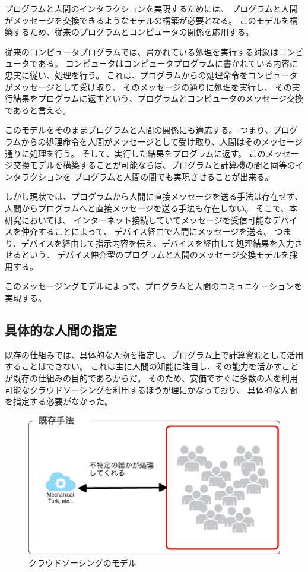 プログラムと人間のインタラクションを実現するためには、
プログラムと人間がメッセージを交換できるようなモデルの構築が必要となる。
このモデルを構築するため、従来のプログラムとコンピュータの関係を応用する。

従来のコンピュータプログラムでは、書かれている処理を実行する対象はコンピュータである。
コンピュータはコンピュータプログラムに書かれている内容に忠実に従い、処理を行う。
これは、プログラムからの処理命令をコンピュータがメッセージとして受け取り、
そのメッセージの通りに処理を実行し、
その実行結果をプログラムに返すという、プログラムとコンピュータのメッセージ交換であると言える。

このモデルをそのままプログラムと人間の関係にも適応する。
つまり、プログラムからの処理命令を人間がメッセージとして受け取り、人間はそのメッセージ通りに処理を行う。
そして、実行した結果をプログラムに返す。
このメッセージ交換モデルを構築することが可能ならば、プログラムと計算機の間と同等のインタラクションを
プログラムと人間の間でも実現させることが出来る。

しかし現状では、プログラムから人間に直接メッセージを送る手法は存在せず、
人間からプログラムへと直接メッセージを送る手法も存在しない。
そこで、本研究においては、
インターネット接続していてメッセージを受信可能なデバイスを仲介することによって、
デバイス経由で人間にメッセージを送る。
つまり、デバイスを経由して指示内容を伝え、デバイスを経由して処理結果を入力させるという、
デバイス仲介型のプログラムと人間のメッセージ交換モデルを採用する。

このメッセージングモデルによって、プログラムと人間のコミュニケーションを実現する。

\subsection{具体的な人間の指定}\label{ux5177ux4f53ux7684ux306aux4ebaux9593ux306eux6307ux5b9a}

既存の仕組みでは、具体的な人物を指定し、プログラム上で計算資源として活用することはできない。
これは主に人間の知能に注目し、その能力を活かすことが既存の仕組みの目的であるからだ。
そのため、安価ですぐに多数の人を利用可能なクラウドソーシングを利用するほうが理にかなっており、
具体的な人間を指定する必要がなかった。

\begin{figure}[htbp]
  \begin{center}
  \includegraphics[width=.5\linewidth]{images/crowdsourcing_model.eps}
  \end{center}
  \caption{クラウドソーシングのモデル}
  \label{fig:crowdsourcing_model}
\end{figure}

